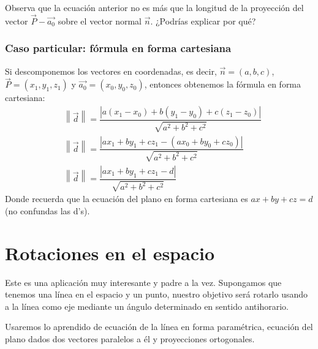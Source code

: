 \documentclass[12pt, fleqn]{report}                             %
\theoremstyle{break}                                            %
\newcommand{\abs}[1]{\left\lvert #1 \right\lvert}               %
\newcommand{\Abs}[1]{\left\lVert #1 \right\lVert}               %
\newcommand{\lVec}[1]{\overrightarrow{#1}}                      %
\begin{document}
        Observa que la ecuación anterior no es más que la longitud de la proyección del vector $\vec{P} - \lVec{a_0}$ sobre el vector normal $\vec{n}$. ¿Podrías explicar por qué?
        
	        \subsubsection{Caso particular: fórmula en forma cartesiana}
	        
	        Si descomponemos los vectores en coordenadas, es decir, $\vec{n}=(a,b,c)$, $\vec{P}=(x_1, y_1, z_1)$ y $\lVec{a_0}=(x_0, y_0, z_0)$, entonces obtenemos la fórmula en forma cartesiana:
	        \begin{align}
		        &\Abs{\vec{d}} = \dfrac{\abs{a(x_1 - x_0) + b(y_1 - y_0) + c(z_1 - z_0)}}{\sqrt{a^2+b^2+c^2}} \nonumber \\
		        &\Abs{\vec{d}} = \dfrac{\abs{ax_1 + by_1 + cz_1 - (ax_0 + by_0 + cz_0)}}{\sqrt{a^2+b^2+c^2}} \nonumber \\
		        &\Abs{\vec{d}} = \dfrac{\abs{ax_1 + by_1 + cz_1 - d}}{\sqrt{a^2+b^2+c^2}}
	        \end{align}
	        Donde recuerda que la ecuación del plano en forma cartesiana es $ax+by+cz=d$ (no confundas las d's).
	        
	    \clearpage
	    
        
        \section{Rotaciones en el espacio}
        
        Este es una aplicación muy interesante y padre a la vez. Supongamos que tenemos una línea en el espacio y un punto, nuestro objetivo será rotarlo usando a la línea como eje mediante un ángulo determinado en sentido antihorario.
        
        Usaremos lo aprendido de ecuación de la línea en forma paramétrica, ecuación del plano dados dos vectores paralelos a él y proyecciones ortogonales.
        
\end{document}
